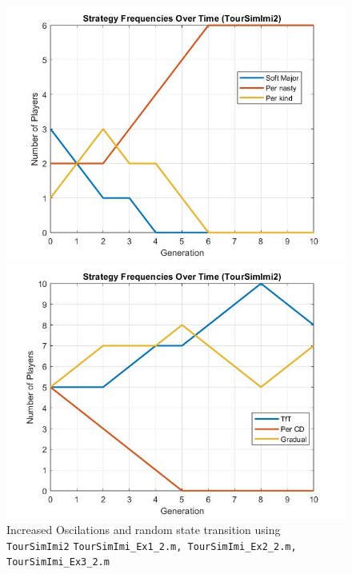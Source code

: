 \begin{figure}
\begin{minipage}{0.48\textwidth}
	
	\end{minipage}
	\centering	
		\begin{minipage}{0.48\textwidth}
		\includegraphics[width=0.7\linewidth]{toursimimi333}
		
	\end{minipage}
		\begin{minipage}{0.48\textwidth}
		\centering
		\includegraphics[width=0.7\linewidth]{toursimimi2222}
		
	\end{minipage}
	\caption{Increased Oscilations and random state transition using \texttt{TourSimImi2} \texttt{TourSimImi\_Ex1\_2.m, TourSimImi\_Ex2\_2.m,  TourSimImi\_Ex3\_2.m }}
\end{figure}
